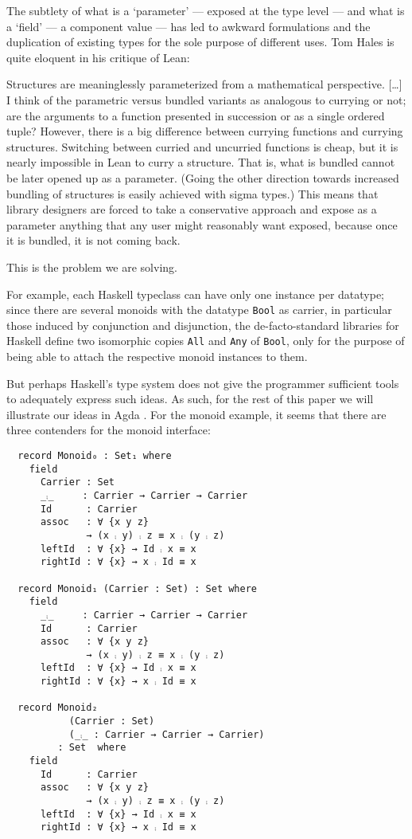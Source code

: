 \documentclass[sigplan,screen]{acmart}
\begin{document}
The subtlety of what is a ‘parameter’ --- exposed at the type level --- and what is a
‘field’ --- a component value --- has led to awkward formulations and
the duplication of existing types for the sole purpose of different uses.
Tom Hales \cite{Hales-blog-post} is quite eloquent in his critique of Lean:
\begin{quoting}
 Structures are meaninglessly parameterized from a mathematical perspective.
 [\ldots{}] I think of the parametric versus bundled variants as analogous to currying
 or not; are the arguments to a function presented in succession or as a single
 ordered tuple? However, there is a big difference between currying functions
 and currying structures. Switching between curried and uncurried functions is
 cheap, but it is nearly impossible in Lean to curry a structure. That is, what
 is bundled cannot be later opened up as a parameter. (Going the other direction
 towards increased bundling of structures is easily achieved with sigma types.)
This means that library designers are forced to take a conservative approach and
expose as a parameter anything that any user might reasonably want exposed, because
once it is bundled, it is not coming back.
\end{quoting}
This is the problem we are solving.

For example, each Haskell typeclass can have only one instance per datatype;
since there are several monoids with the datatype \texttt{Bool} as carrier,
in particular those induced by conjunction and disjunction,
the de-facto-standard libraries for Haskell
define two isomorphic copies \texttt{All} and \texttt{Any} of \texttt{Bool},
only for the purpose of being able to attach the respective monoid instances to them.

But perhaps Haskell's type system does not give the programmer sufficient
tools to adequately express such ideas. As such, for the rest of this paper
we will illustrate our ideas in Agda \cite{Norell-2007,agda_overview}.
For the monoid example,
it seems that there are three contenders for the monoid interface:

\noindent
\begin{verbatim}
  record Monoid₀ : Set₁ where
    field
      Carrier : Set
      _⨾_     : Carrier → Carrier → Carrier
      Id      : Carrier
      assoc   : ∀ {x y z}
              → (x ⨾ y) ⨾ z ≡ x ⨾ (y ⨾ z)
      leftId  : ∀ {x} → Id ⨾ x ≡ x
      rightId : ∀ {x} → x ⨾ Id ≡ x

  record Monoid₁ (Carrier : Set) : Set where
    field
      _⨾_     : Carrier → Carrier → Carrier
      Id      : Carrier
      assoc   : ∀ {x y z}
              → (x ⨾ y) ⨾ z ≡ x ⨾ (y ⨾ z)
      leftId  : ∀ {x} → Id ⨾ x ≡ x
      rightId : ∀ {x} → x ⨾ Id ≡ x

  record Monoid₂
           (Carrier : Set)
           (_⨾_ : Carrier → Carrier → Carrier)
         : Set  where
    field
      Id      : Carrier
      assoc   : ∀ {x y z}
              → (x ⨾ y) ⨾ z ≡ x ⨾ (y ⨾ z)
      leftId  : ∀ {x} → Id ⨾ x ≡ x
      rightId : ∀ {x} → x ⨾ Id ≡ x
\end{verbatim}
\end{document}
